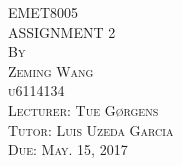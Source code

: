 \documentclass{article}
\begin{document}
\thispagestyle{empty}
\begin{center}
\huge
\vspace*{2.0in} EMET8005 
\\\vspace{0.5in} ASSIGNMENT 2
\normalsize
\\\vspace{0.5in} \textsc{By}
\\\vspace{0.1in} \textsc{Zeming Wang}
\\\vspace{0.1in} \textsc{u6114134}
\normalsize
\\\vspace{0.5in} \textsc{Lecturer: Tue Gørgens}
\\\vspace{0.1in} \textsc{Tutor: Luis Uzeda Garcia}
\normalsize
\\\vspace{0.5in} \textsc{Due: May. 15, 2017}
\end{center}

\newpage
\setcounter{page}{1}
\end{document}

